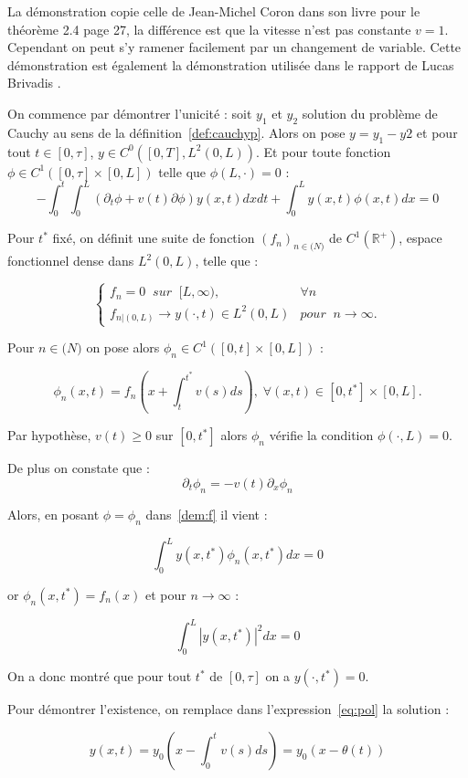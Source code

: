 \documentclass[a4paper]{article}
\begin{document}
\begin{preuve}
	La démonstration copie celle de Jean-Michel Coron dans son livre \cite{JMCoron} pour le théorème 2.4 page 27, la différence est que la vitesse n'est pas constante $v=1$. Cependant on peut s'y ramener facilement par un changement de variable. Cette démonstration est également la démonstration utilisée dans le rapport de Lucas Brivadis \cite{LBrivadis}. 
	
	On commence par démontrer l'unicité : 
	soit $y_1$ et $y_2$ solution du problème de Cauchy au sens de la définition~\ref{def:cauchyp}. 
	Alors on pose $y=y_1-y2$ et pour tout $t \in [0,\tau]$, $y \in C^0([0,T],L^2(0,L))$.
	Et pour toute fonction $\phi \in C^1([0,\tau] \times [0,L])$ telle que $\phi (L,\cdot)=0$ :
\begin{equation}
	\label{dem:f}
	-\int_0^t \int_0^L (\partial_t \phi +v(t)\partial \phi) y(x,t) dxdt 
			+ \int_0^L y(x,t) \phi (x,t) dx =0
\end{equation}

	Pour $t^*$ fixé, on définit une suite de fonction $(f_n)_{n \in \mathbb(N)}$ de $C^1(\mathbb{R}^+)$, espace fonctionnel dense dans $L^2(0,L)$, telle que :
	
\[
\begin{cases}
	f_n =0 \; \; sur \; \; [L, \infty), & \forall n \\
	f_{n|(0,L)} \to y(\cdot,t) \in L^2(0,L) & pour \; \;  n\rightarrow \infty.
\end{cases}
\]

Pour $n \in \mathbb(N)$ on pose alors $\phi_n \in C^1([0,t]\times [0,L])$ :

\[ \phi_n(x,t) = f_n(x + \int_t^{t^*} v(s)ds), \; \forall (x,t) \in [0,t^*]\times [0,L]. \]

Par hypothèse, $v(t) \geq 0$ sur $[0, t^*]$ alors $\phi_n$ vérifie la condition $\phi (\cdot, L)=0$.

De plus on constate que :
\[ \partial_t \phi_n = -v(t) \partial_x \phi_n \]

Alors, en posant $\phi = \phi_n$ dans~\eqref{dem:f} il vient :

\[ \int_0^L y(x,t^*) \phi_n (x,t^*) dx =0 \]

or $\phi_n (x,t^*) = f_n(x)$ et pour $n \rightarrow \infty$ :

\[ \int_0^L |y(x,t^*)|^2 dx =0 \]

On a donc montré que pour tout $t^*$ de $[0,\tau]$ on a $y(\cdot, t^*) =0 $.

Pour démontrer l'existence, on remplace dans l'expression~\eqref{eq:pol} la solution :

\begin{equation}
	\label{sol:p}
		y(x,t) = y_0(x-\int_0^tv(s)ds) = y_0(x-\theta(t))
\end{equation}

\end{preuve}
\end{document}
